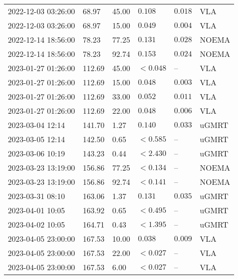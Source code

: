 \documentclass{nature_plusfigure}
\begin{document}
\begin{supplement}
\begin{center}
\begin{longtable}{llllll}
2022-12-03 03:26:00 & 68.97 & 45.00 & $0.108$ & $0.018$ & VLA \\ 
2022-12-03 03:26:00 & 68.97 & 15.00 & $0.049$ & $0.004$ & VLA \\ 
2022-12-14 18:56:00 & 78.23 & 77.25 & $0.131$ & $0.028$ & NOEMA \\ 
2022-12-14 18:56:00 & 78.23 & 92.74 & $0.153$ & $0.024$ & NOEMA \\ 
2023-01-27 01:26:00 & 112.69 & 45.00 & $<0.048$ & -- & VLA \\ 
2023-01-27 01:26:00 & 112.69 & 15.00 & $0.048$ & $0.003$ & VLA \\ 
2023-01-27 01:26:00 & 112.69 & 33.00 & $0.052$ & $0.011$ & VLA \\ 
2023-01-27 01:26:00 & 112.69 & 22.00 & $0.048$ & $0.006$ & VLA \\ 
2023-03-04 12:14 & 141.70 & 1.27 & $0.140$ & $0.033$ & uGMRT \\ 
2023-03-05 12:14 & 142.50 & 0.65 & $<0.585$ & -- & uGMRT \\ 
2023-03-06 10:19 & 143.23 & 0.44 & $<2.430$ & -- & uGMRT \\ 
2023-03-23 13:19:00 & 156.86 & 77.25 & $<0.134$ & -- & NOEMA \\ 
2023-03-23 13:19:00 & 156.86 & 92.74 & $<0.141$ & -- & NOEMA \\ 
2023-03-31 08:10 & 163.06 & 1.37 & $0.131$ & $0.035$ & uGMRT \\ 
2023-04-01 10:05 & 163.92 & 0.65 & $<0.495$ & -- & uGMRT \\ 
2023-04-02 10:05 & 164.71 & 0.43 & $<1.395$ & -- & uGMRT \\ 
2023-04-05 23:00:00 & 167.53 & 10.00 & $0.038$ & $0.009$ & VLA \\ 
2023-04-05 23:00:00 & 167.53 & 22.00 & $<0.027$ & -- & VLA \\ 
2023-04-05 23:00:00 & 167.53 & 6.00 & $<0.027$ & -- & VLA \\ 
\hline 
\end{longtable} 
\end{center} 


\end{supplement}

\end{document}

